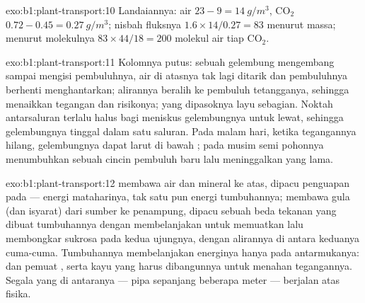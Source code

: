\begin{solution}{exo:b1:plant-transport:10}
Landaiannya: air $23 - 9 = \qty{14}{g/m^3}$, $\mathrm{CO_2}$ $0.72 -
0.45 = \qty{0.27}{g/m^3}$; nisbah fluksnya $1.6\times 14/0.27 = 83$
menurut massa; menurut molekulnya $83\times 44/18 = 200$ molekul air tiap
$\mathrm{CO_2}$.
\end{solution}

\begin{solution}{exo:b1:plant-transport:11}
Kolomnya putus: sebuah gelembung mengembang sampai mengisi pembuluhnya,
air di atasnya tak lagi ditarik dan pembuluhnya berhenti menghantarkan;
alirannya beralih ke pembuluh tetangganya, sehingga menaikkan tegangan
dan risikonya;  yang dipasoknya layu sebagian. Noktah antarsaluran
terlalu halus bagi meniskus gelembungnya untuk lewat, sehingga
gelembungnya tinggal dalam satu saluran. Pada malam hari, ketika
tegangannya hilang, gelembungnya dapat larut di bawah ;
pada musim semi pohonnya menumbuhkan sebuah cincin pembuluh baru lalu
meninggalkan yang lama.
\end{solution}

\begin{solution}{exo:b1:plant-transport:12}
 membawa air dan mineral ke atas, dipacu penguapan pada
 --- energi mataharinya, tak satu pun energi tumbuhannya;
 membawa gula (dan isyarat) dari sumber ke penampung, dipacu
sebuah beda tekanan yang dibuat tumbuhannya dengan membelanjakan 
untuk memuatkan lalu membongkar sukrosa pada kedua ujungnya, dengan
alirannya di antara keduanya cuma-cuma. Tumbuhannya membelanjakan
energinya hanya pada antarmukanya:   dan
pemuat , serta kayu yang harus dibangunnya untuk menahan
tegangannya. Segala yang di antaranya --- pipa sepanjang beberapa meter
--- berjalan atas fisika.
\end{solution}

